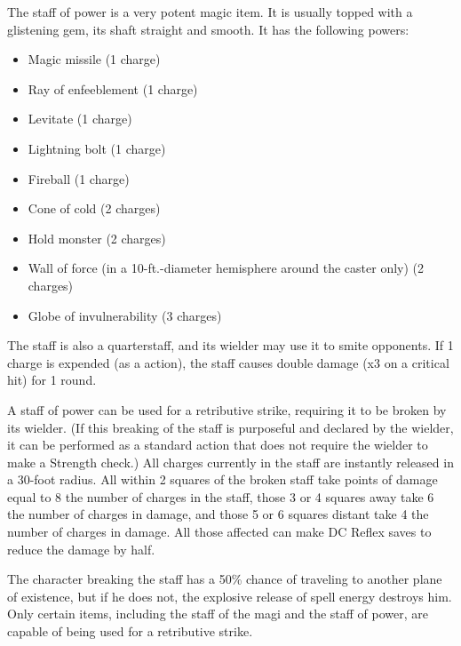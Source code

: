 
 The staff of power is a very potent magic item. It is usually topped with a glistening gem, its shaft straight and smooth. It has the following powers:
\begin{itemize}
\item Magic missile (1 charge)
\item Ray of enfeeblement (1 charge)
\item Levitate (1 charge)
\item Lightning bolt (1 charge)
\item Fireball (1 charge)
\item Cone of cold (2 charges)
\item Hold monster (2 charges)
\item Wall of force (in a 10-ft.-diameter hemisphere around the caster only) (2 charges)
\item Globe of invulnerability (3 charges)
\end{itemize}

The staff is also a  quarterstaff, and its wielder may use it to smite opponents. If 1 charge is expended (as a  action), the staff causes double damage (x3 on a critical hit) for 1 round.

A staff of power can be used for a retributive strike, requiring it to be broken by its wielder. (If this breaking of the staff is purposeful and declared by the wielder, it can be performed as a standard action that does not require the wielder to make a Strength check.) All charges currently in the staff are instantly released in a 30-foot radius. All within 2 squares of the broken staff take points of damage equal to 8 \mtimes the number of charges in the staff, those 3 or 4 squares away take 6 \mtimes the number of charges in damage, and those 5 or 6 squares distant take 4 \mtimes the number of charges in damage. All those affected can make DC  Reflex saves to reduce the damage by half.

The character breaking the staff has a 50\% chance of traveling to another plane of existence, but if he does not, the explosive release of spell energy destroys him. Only certain items, including the staff of the magi and the staff of power, are capable of being used for a retributive strike.

